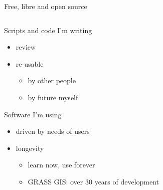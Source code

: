 \documentclass[xcolor={dvipsnames,usenames},beamer,aspectratio=169]{beamer}
\begin{document}
\begin{frame}{Free, libre and open source}

\begin{columns}
\begin{column}{0.4\textwidth}

Scripts and code I'm writing

\begin{itemize}
  \item review
  \item re-usable
  \begin{itemize}
  \item by other people
  \item by future myself
  \end{itemize}
\end{itemize}

Software I'm using

\begin{itemize}
  \item driven by needs of users
  \item longevity
  \begin{itemize}
  \item learn now, use forever
  \item GRASS GIS: over 30 years of development
  \end{itemize}
\end{itemize}

\end{column}
\begin{column}{0.3\textwidth}


\end{column}
\end{columns}
\end{frame}
\end{document}

